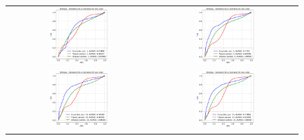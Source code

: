     \begin{figure}
        \centering
        \begin{tabular}{cc}
            \includegraphics[width = 0.42\textwidth, height= 0.3\textheight]{images/AUROC/Entropy_cnc_1.pdf} & 
            \includegraphics[width = 0.42\textwidth, height= 0.3\textheight]{images/AUROC/Entropy_cnc_5.pdf}\\ 
            \includegraphics[width = 0.42\textwidth, height= 0.3\textheight]{images/AUROC/Entropy_cnc_10.pdf} &
            \includegraphics[width = 0.42\textwidth, height= 0.3\textheight]{images/AUROC/Entropy_cnc_15.pdf} \\ 

\end{tabular}
\end{figure}
